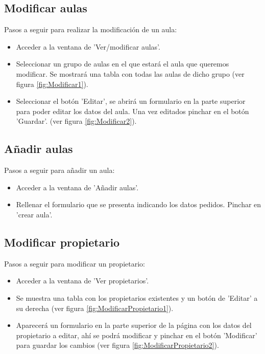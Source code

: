 \subsection{Modificar aulas}
Pasos a seguir para realizar la modificación de un aula:
\begin{itemize}
    \item Acceder a la ventana de 'Ver/modificar aulas'.
    \item Seleccionar un grupo de aulas en el que estará el aula que queremos modificar. Se mostrará una tabla con todas las aulas de dicho grupo (ver figura \ref{fig:Modificar1}).
    \item Seleccionar el botón 'Editar', se abrirá un formulario en la parte superior para poder editar los datos del aula. Una vez editados pinchar en el botón 'Guardar'. (ver figura \ref{fig:Modificar2}).
\end{itemize}

\subsection{Añadir aulas}
Pasos a seguir para añadir un aula:
\begin{itemize}
    \item Acceder a la ventana de 'Añadir aulas'.
    \item Rellenar el formulario que se presenta indicando los datos pedidos. Pinchar en 'crear aula'.
\end{itemize}

\subsection{Modificar propietario}
Pasos a seguir para modificar un propietario:
\begin{itemize}
    \item Acceder a la ventana de 'Ver propietarios'.
    \item Se muestra una tabla con los propietarios existentes y un botón de 'Editar' a su derecha (ver figura \ref{fig:ModificarPropietario1}).
    \item Aparecerá un formulario en la parte superior de la página con los datos del propietario a editar, ahí se podrá modificar y pinchar en el botón 'Modificar' para guardar los cambios (ver figura \ref{fig:ModificarPropietario2}).
\end{itemize}
